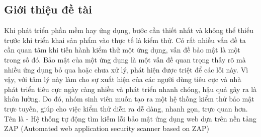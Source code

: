 \subsection{Giới thiệu đề tài}
\tab Khi phát triển phần mềm hay ứng dụng, bước cần thiết nhất và không thể thiếu
trước khi triển khai sản phẩm vào thực tế là kiểm thử. Có rất nhiều vấn đề ta cần
quan tâm khi tiến hành kiểm thử một ứng dụng, vấn đề bảo mật là một trong số đó. Bảo mật
của một ứng dụng là một vấn đề quan trọng thấy rõ mà nhiều ứng dụng bỏ qua hoặc chưa xử lý, phát hiện
được triệt để các lỗi này. Vì vậy, với tâm lý này làm cho sự xuất hiện của các người dùng tiêu cực và
nhà phát triển tiêu cực ngày càng nhiều và phát triển nhanh chóng, hậu quả gây ra là khôn lường.
Do đó, nhóm sinh viên muốn tạo ra một hệ thống kiểm thử bảo mật trực tuyến, giúp cho việc kiểm thử diễn ra dễ dàng,
nhanh gọn, trực quan hơn. Tên là \applicationname - Hệ thống tự động tìm kiếm lỗi bảo mật ứng dụng web dựa trên nền tảng ZAP (Automated web application security scanner based on ZAP)